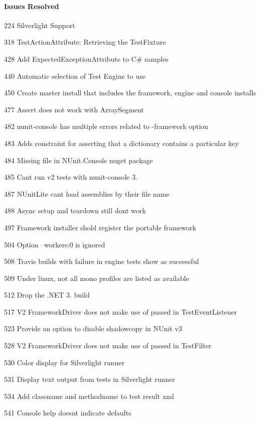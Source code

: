\paragraph*{Issues Resolved}


\begin{DoxyItemize}
\item 224 Silverlight Support
\item 318 Test\+Action\+Attribute\+: Retrieving the Test\+Fixture
\item 428 Add Expected\+Exception\+Attribute to C\# samples
\item 440 Automatic selection of Test Engine to use
\item 450 Create master install that includes the framework, engine and console installs
\item 477 Assert does not work with Array\+Segment
\item 482 nunit-\/console has multiple errors related to -\/framework option
\item 483 Adds constraint for asserting that a dictionary contains a particular key
\item 484 Missing file in N\+Unit.\+Console nuget package
\item 485 Can\textquotesingle{}t run v2 tests with nunit-\/console 3.
\item 487 N\+Unit\+Lite can\textquotesingle{}t load assemblies by their file name
\item 488 Async setup and teardown still don\textquotesingle{}t work
\item 497 Framework installer shold register the portable framework
\item 504 Option --workers\+:0 is ignored
\item 508 Travis builds with failure in engine tests show as successful
\item 509 Under linux, not all mono profiles are listed as available
\item 512 Drop the .N\+ET 3. build
\item 517 V2 Framework\+Driver does not make use of passed in Test\+Event\+Listener
\item 523 Provide an option to disable shadowcopy in N\+Unit v3
\item 528 V2 Framework\+Driver does not make use of passed in Test\+Filter
\item 530 Color display for Silverlight runner
\item 531 Display text output from tests in Silverlight runner
\item 534 Add classname and methodname to test result xml
\item 541 Console help doesn\textquotesingle{}t indicate defaults
\end{DoxyItemize}

